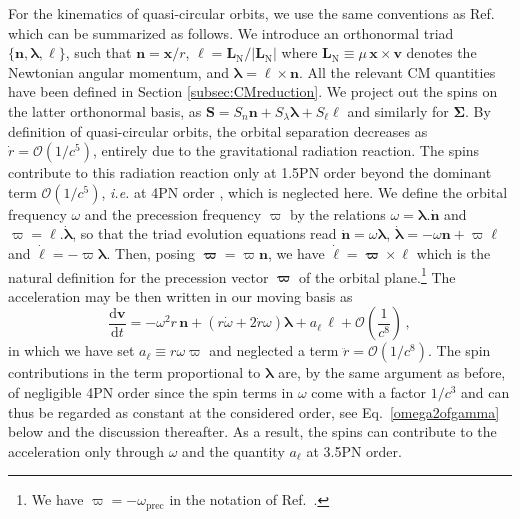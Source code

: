 \documentclass[
superscriptaddress,
preprint,
prd,tightenlines,showpacs,nofootinbib,
eqsecnum,
amsfonts,amsmath,amssymb]{revtex4-1}
\newcommand{\ud}{\mathrm{d}}
\newcommand{\calO}{\mathcal{O}}
\begin{document}
For the kinematics of quasi-circular orbits, we use the same
conventions as Ref.~\cite{Faye2006} which can be summarized as
follows. We introduce an orthonormal triad
$\{\mathbf{n},\bm{\lambda},\bm{\ell}\}$, such that
$\mathbf{n}=\mathbf{x}/r$,
$\bm{\ell}=\mathbf{L}_\mathrm{N}/\vert\mathbf{L}_\mathrm{N}\vert$
where $\mathbf{L}_\mathrm{N}\equiv\mu\,\mathbf{x}\times\mathbf{v}$
denotes the Newtonian angular momentum, and
$\bm{\lambda}=\bm{\ell}\times\mathbf{n}$. All the relevant CM
quantities have been defined in Section \ref{subsec:CMreduction}. We
project out the spins on the latter orthonormal basis, as $\mathbf{S}=
S_n \mathbf{n} + S_\lambda \bm{\lambda} + S_\ell \bm{\ell}$ and
similarly for $\mathbf{\Sigma}$. By definition of quasi-circular
orbits, the orbital separation decreases as $\dot{r}=\calO(1/c^5)$,
entirely due to the gravitational radiation reaction.  The spins
contribute to this radiation reaction only at 1.5PN order beyond the
dominant term $\calO(1/c^5)$, \textit{i.e.} at 4PN order
\cite{Will05}, which is neglected here. We define the orbital
frequency $\omega$ and the precession frequency $\varpi$ by the
relations $\omega = \bm{\lambda}.\dot{\bm{n}}$ and $\varpi =
\bm{\ell}.\dot{\bm{\lambda}}$, so that the triad evolution equations
read $\dot{\bm{n}} = \omega\bm{\lambda}$, $\dot{\bm{\lambda}} =
-\omega\bm{n} + \varpi \bm{\ell}$ and $\dot{\bm{\ell}} = - \varpi
\bm{\lambda}$. Then, posing $\bm{\varpi}=\varpi\bm{n}$, we have
  $\dot{\bm{\ell}} = \bm{\varpi}\times\bm{\ell}$ which is the natural
  definition for the precession vector $\bm{\varpi}$ of the orbital
  plane.\footnote{We have $\varpi=-\omega_\text{prec}$ in the
    notation of Ref.~\cite{Blanchet2011}.}  The acceleration may be
then written in our moving basis as
%
\begin{equation}\label{acirc}
  \frac{\ud \mathbf{v}}{\ud t} = - \omega^2 r\,\mathbf{n} + (r\dot{\omega} +
  2\dot{r}\omega)\bm{\lambda} + a_\ell\,\bm{\ell} 
  + \mathcal{O}\left(\frac{1}{c^8}\right) \, ,
\end{equation}
%
in which we have set $a_{\ell} \equiv r \omega \varpi$ and neglected a
term $\ddot{r}=\mathcal{O}(1/c^{8})$. The spin contributions in the
term proportional to $\bm{\lambda}$ are, by the same argument as
before, of negligible 4PN order since the spin terms in $\omega$ come
with a factor $1/c^3$ and can thus be regarded as constant at the
considered order, see Eq.~\eqref{omega2ofgamma} below and the
discussion thereafter. As a result, the spins can contribute to the
acceleration only through $\omega$ and the quantity $a_\ell$ at 3.5PN
order.
\end{document}
